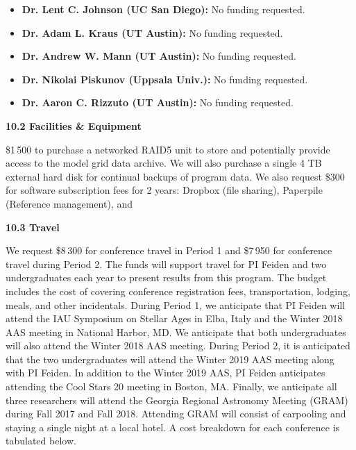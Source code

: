 \begin{itemize}
	\item[] {\bf Dr. Lent C. Johnson (UC San Diego):} No funding requested. \\
	
	\item[] {\bf Dr. Adam L. Kraus (UT Austin):} No funding requested. \\
	
	\item[] {\bf Dr. Andrew W. Mann (UT Austin):} No funding requested. \\
	
	\item[] {\bf Dr. Nikolai Piskunov (Uppsala Univ.):} No funding requested. \\
	
	\item[] {\bf Dr. Aaron C. Rizzuto (UT Austin):} No funding requested. \\
\end{itemize} 

{\bf 10.2 Facilities \& Equipment}

\$1\,500 to purchase a networked RAID5 unit to store and potentially provide access to the model grid data archive. We will also purchase a single 4 TB external hard disk for continual backups of program data. We also request \$300 for software subscription fees for 2 years: Dropbox (file sharing), Paperpile (Reference management), and 

{\bf 10.3 Travel}

We request \$8\,300 for conference travel in Period 1 and \$7\,950 for conference travel during Period 2. The funds will support travel for PI Feiden and two undergraduates each year to present results from this program. The budget includes the cost of covering conference registration fees, transportation, lodging, meals, and other incidentals. During Period 1, we anticipate that PI Feiden will attend the IAU Symposium on Stellar Ages in Elba, Italy and the Winter 2018 AAS meeting in National Harbor, MD. We anticipate that both undergraduates will also attend the Winter 2018 AAS meeting. During Period 2, it is anticipated that the two undergraduates will attend the Winter 2019 AAS meeting along with PI Feiden. In addition to the Winter 2019 AAS, PI Feiden anticipates attending the Cool Stars 20 meeting in Boston, MA. Finally, we anticipate all three researchers will attend the Georgia Regional Astronomy Meeting (GRAM) during Fall 2017 and Fall 2018. Attending GRAM will consist of carpooling and staying a single night at a local hotel. A cost breakdown for each conference is tabulated below. \\

